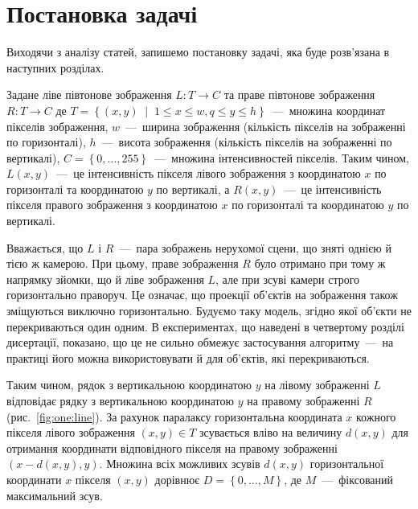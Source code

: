 \section{Постановка задачі}

Виходячи з аналізу статей, запишемо постановку задачі,
яка буде розв'язана в наступних розділах.

Задане ліве півтонове зображення $L : T \to C$
та праве півтонове зображення $R : T \to C$
де
$T = \left\{
    \left( x, y \right) \; \middle| \; 1 \le x \le w, q \le y \le h
\right\}$~---~множина координат пікселів зображення,
$w$~---~ширина зображення (кількість пікселів на зображенні по горизонталі),
$h$~---~висота зображення (кількість пікселів на зображенні по вертикалі),
$C = \left\{ 0, \dotsc, 255 \right\} $~---~множина інтенсивностей пікселів.
Таким чином,
$L \left(x, y \right)$~---~це інтенсивність пікселя лівого зображення
з координатою $x$ по горизонталі та координатою $y$ по вертикалі,
а $R \left( x, y \right)$~---~це інтенсивність пікселя правого зображення
з координатою $x$ по горизонталі та координатою $y$ по вертикалі.

Вважається, що $L$ і $R$~---~пара зображень нерухомої сцени,
що зняті однією й тією ж камерою.
При цьому, праве зображення $R$ було отримано при тому ж напрямку зйомки,
що й ліве зображення $L$, але при зсуві камери строго горизонтально праворуч.
Це означає,
що проекції об'єктів на зображення також зміщуються виключно горизонтально.
Будуємо таку модель, згідно якої об'єкти не перекриваються один одним.
В експериментах, що наведені в четвертому розділі дисертації, показано,
що це не сильно обмежує застосування алгоритму~---~на практиці його можна
використовувати й для об'єктів, які перекриваються.

Таким чином, рядок з вертикальною координатою $y$
на лівому зображенні $L$ відповідає
рядку з вертикальною координатою $y$ на правому зображенні $R$
(рис.~\ref{fig:one:line}).
За рахунок паралаксу горизонтальна координата $x$
кожного пікселя лівого зображення $\left( x, y \right) \in T$
зсувається вліво на величину $d \left(x, y \right) $
для отримання координати відповідного пікселя на правому зображенні
$\left( x - d \left(x, y \right), y \right)$.
Множина всіх можливих зсувів $d \left(x, y \right)$
горизонтальної координати $x$ пікселя $\left(x, y \right)$ дорівнює
$D = \left\{ 0, \dotsc, M \right\}$, де $M$~---~фіксований максимальний зсув.

